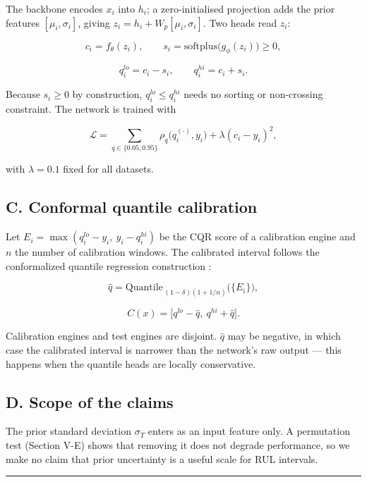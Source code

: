 ﻿\documentclass[journal]{IEEEtran}
\begin{document}
The backbone encodes \(x_i\) into \(h_i\); a zero-initialised projection adds the prior features \([\mu_i, \sigma_i]\), giving \(z_i = h_i + W_p[\mu_i, \sigma_i]\). Two heads read \(z_i\):

\[c_i = f_\theta(z_i), \qquad s_i = \mathrm{softplus}\big(g_\phi(z_i)\big) \ge 0,\]

\[q^{lo}_i = c_i - s_i, \qquad q^{hi}_i = c_i + s_i .\]

Because \(s_i \ge 0\) by construction, \(q^{lo}_i \le q^{hi}_i\) needs no sorting or non-crossing constraint. The network is trained with

\[\mathcal{L} = \sum_{q\in\{0.05,0.95\}} \rho_q\big(q^{(\cdot)}_i, y_i\big) + \lambda (c_i - y_i)^2 ,\]

with \(\lambda = 0.1\) fixed for all datasets.

\subsection{C. Conformal quantile calibration}\label{c.-conformal-quantile-calibration}

Let \(E_i = \max(q^{lo}_i - y_i,\ y_i - q^{hi}_i)\) be the CQR score of a calibration engine and \(n\) the number of calibration windows. The calibrated interval follows the conformalized quantile regression construction \citep{romano2019}:

\[\hat{q} = \mathrm{Quantile}_{\,(1-\delta)(1+1/n)}\big(\{E_i\}\big),\]

\[C(x) = \big[q^{lo} - \hat{q},\ q^{hi} + \hat{q}\big].\]

Calibration engines and test engines are disjoint. \(\hat{q}\) may be negative, in which case the calibrated interval is narrower than the network's raw output --- this happens when the quantile heads are locally conservative.

\subsection{D. Scope of the claims}\label{d.-scope-of-the-claims}

The prior standard deviation \(\sigma_T\) enters as an input feature only. A permutation test (Section V-E) shows that removing it does not degrade performance, so we make no claim that prior uncertainty is a useful scale for RUL intervals.

\begin{center}\rule{0.5\linewidth}{0.5pt}\end{center}
\end{document}

